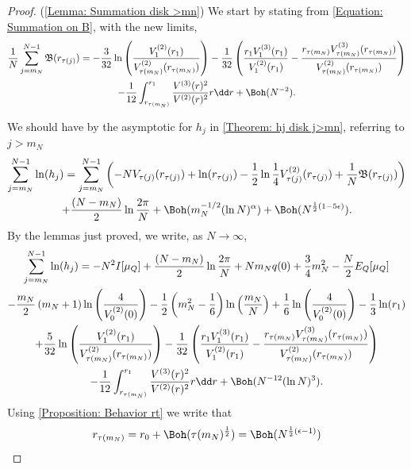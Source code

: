 \begin{proof} (\autoref{Lemma: Summation disk >mn})
	We start by stating from \eqref{Equation: Summation on B}, with the new limits,
	\begin{multline}
					\frac{1}{N} \sum_{j=m_N}^{N-1} \mathfrak{B}(r_{\tau(j)})  = - \frac{3}{32} \ln\left( \frac{V^{(2)}_1(r_1)}{V^{(2)}_{\tau(m_N)}(r_{\tau(m_N)})} \right) - \frac{1}{32} \left( \frac{r_1  V^{(3)}_1(r_1)}{V^{(2)}_1(r_1)} - \frac{r_{\tau(m_N)} V^{(3)}_{\tau(m_N)}(r_{\tau(m_N)})}{V^{(2)}_{\tau(m_N)}(r_{\tau(m_N)})}\right) \\ - \frac{1}{12} \int_{r_{\tau(m_N)}}^{r_1} \frac{V^{(3)}(r)^2}{V^{(2)}(r)^{2}} r \dd r + \Boh(N^{-2}).
	\end{multline}
	
	We should have by the asymptotic for $h_j$ in \autoref{Theorem: hj disk j>mn}, referring to $j > m_N$
	\begin{multline}
		\sum_{j=m_N}^{N-1} \ln (h_j) = 	\sum_{j=m_N}^{N-1}  \left( -N V_{\tau(j)}(r_{\tau(j)}) + \ln(r_{\tau(j)}) -\frac{1}{2} \ln \frac{1}{4}V^{(2)}_{\tau(j)}(r_{\tau(j)}) + \frac{1}{N} \mathfrak{B}(r_{\tau(j)}) \right) \\ + \frac{(N-m_N)}{2} \ln{\frac{2\pi}{N}} + \Boh(m_N^{-1/2} (\ln N)^\alpha) + \Boh(N^{\frac{1}{2}(1-5\epsilon)}).
	\end{multline}
	By the lemmas just proved, we write, as $N \rightarrow \infty$,
	\begin{multline}
		\sum_{j=m_N}^{N-1} \ln (h_j) = -N^2 I[\mu_Q] + \frac{(N-m_N)}{2} \ln{\frac{2\pi}{N}} +  N m_N q(0) + \frac{3}{4} m_N^2 - \frac{N}{2} E_Q[\mu_Q] \\ - \frac{m_N}{2} \left(m_N + 1\right) \ln{\left(\frac{4}{V^{(2)}_0(0)}\right)} - \frac{1}{2} \left( m_N^2 - \frac{1}{6} \right) \ln{\left(\frac{m_N}{N}\right)} + \frac{1}{6} \ln{\left(\frac{4}{V^{(2)}_0(0)}\right)} - \frac{1}{3} \ln(r_1) \\ + \frac{5}{32} \ln\left( \frac{V^{(2)}_1(r_1)}{V^{(2)}_{\tau(m_N)}(r_{\tau(m_N)})} \right) - \frac{1}{32} \left( \frac{r_1  V^{(3)}_1(r_1)}{V^{(2)}_1(r_1)} - \frac{r_{\tau(m_N)} V^{(3)}_{\tau(m_N)}(r_{\tau(m_N)})}{V^{(2)}_{\tau(m_N)}(r_{\tau(m_N)})}\right) \\ - \frac{1}{12} \int_{r_{\tau(m_N)}}^{r_1} \frac{V^{(3)}(r)^2}{V^{(2)}(r)^{2}} r \dd r + \Boh(N^{-12} (\ln N)^3).
	\end{multline}
	Using \autoref{Proposition: Behavior rt} we write that
	\begin{equation}
		r_{\tau(m_N)} = r_0 + \Boh(\tau(m_N)^{\frac{1}{2}}) = \Boh(N^{\frac{1}{2}(\epsilon-1)})

\end{equation}
\end{proof}
